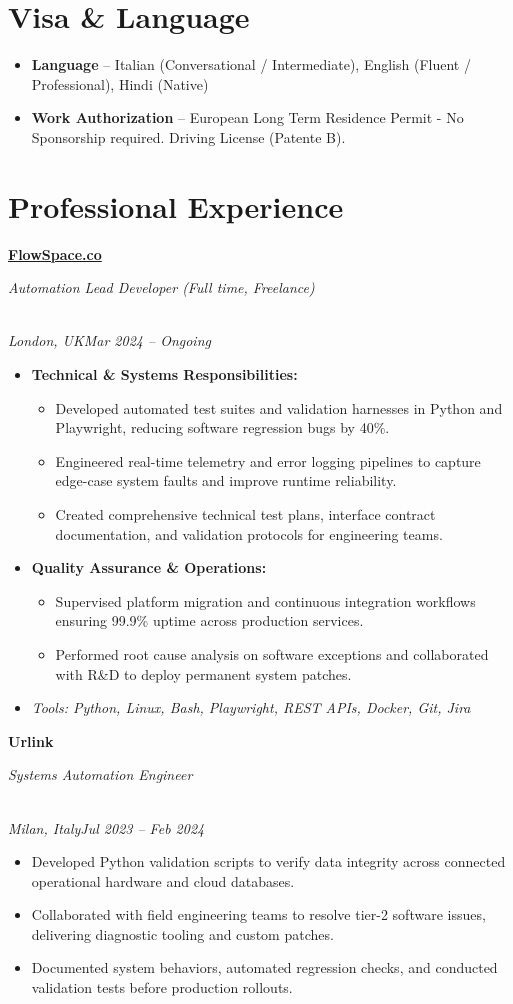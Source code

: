 \documentclass[a4paper,10pt]{article}
\newcommand{\role}[4]{\vspace{3pt}\noindent\hspace{0.6em}\parbox[t]{0.38\textwidth}{\raggedright\textbf{#1}}\hfill\parbox[t]{0.58\textwidth}{\raggedleft\textit{#2}}\\{\textit{#3}\hfill\textit{#4}}\vspace{1pt}}
\begin{document}
\section{Visa \& Language}
\begin{itemize}
\item \textbf{Language} -- Italian (Conversational / Intermediate), English (Fluent / Professional), Hindi (Native)
\item \textbf{Work Authorization} -- European Long Term Residence Permit - No Sponsorship required. Driving License (Patente B).
\end{itemize}

\section{Professional Experience}
\role{\href{https://flowspace.co}{FlowSpace.co}}{Automation Lead Developer (Full time, Freelance)}{London, UK}{Mar 2024 -- Ongoing}
\begin{itemize}
\item \textbf{Technical \& Systems Responsibilities:}
\begin{itemize}[label=--]
\item Developed automated test suites and validation harnesses in Python and Playwright, reducing software regression bugs by 40\%.
\item Engineered real-time telemetry and error logging pipelines to capture edge-case system faults and improve runtime reliability.
\item Created comprehensive technical test plans, interface contract documentation, and validation protocols for engineering teams.
\end{itemize}
\item \textbf{Quality Assurance \& Operations:}
\begin{itemize}[label=--]
\item Supervised platform migration and continuous integration workflows ensuring 99.9\% uptime across production services.
\item Performed root cause analysis on software exceptions and collaborated with R\&D to deploy permanent system patches.
\end{itemize}
\item \textit{Tools: Python, Linux, Bash, Playwright, REST APIs, Docker, Git, Jira}
\end{itemize}

\role{Urlink}{Systems Automation Engineer}{Milan, Italy}{Jul 2023 -- Feb 2024}
\begin{itemize}
\item Developed Python validation scripts to verify data integrity across connected operational hardware and cloud databases.
\item Collaborated with field engineering teams to resolve tier-2 software issues, delivering diagnostic tooling and custom patches.
\item Documented system behaviors, automated regression checks, and conducted validation tests before production rollouts.
\end{itemize}
\end{document}
